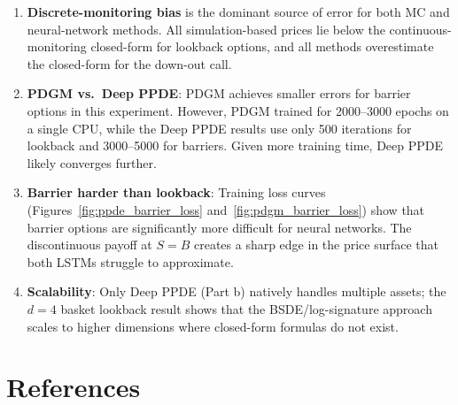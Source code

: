 \documentclass[12pt,a4paper]{article}
\begin{document}
\begin{enumerate}[leftmargin=*, label=\textbf{\arabic*.}]

\item \textbf{Discrete-monitoring bias} is the dominant source of error for
  both MC and neural-network methods.  All simulation-based prices lie below
  the continuous-monitoring closed-form for lookback options, and all
  methods overestimate the closed-form for the down-out call.

\item \textbf{PDGM vs.\ Deep PPDE}: PDGM achieves smaller errors for barrier
  options in this experiment.  However, PDGM trained for 2000--3000 epochs
  on a single CPU, while the Deep PPDE results use only 500 iterations for
  lookback and 3000--5000 for barriers.  Given more training time, Deep PPDE
  likely converges further.

\item \textbf{Barrier harder than lookback}: Training loss curves
  (Figures~\ref{fig:ppde_barrier_loss} and~\ref{fig:pdgm_barrier_loss})
  show that barrier options are significantly more difficult for neural
  networks.  The discontinuous payoff at $S = B$ creates a sharp edge in
  the price surface that both LSTMs struggle to approximate.

\item \textbf{Scalability}: Only Deep PPDE (Part b) natively handles
  multiple assets; the $d = 4$ basket lookback result shows that the
  BSDE/log-signature approach scales to higher dimensions where closed-form
  formulas do not exist.

\end{enumerate}

\clearpage
\section*{References}
\end{document}
